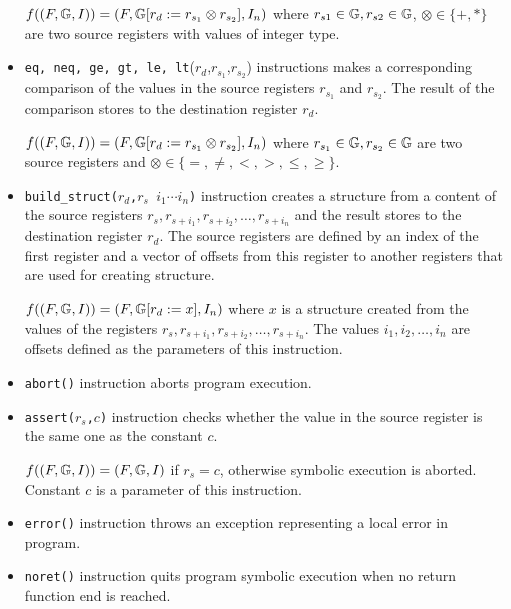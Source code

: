\begin{itemize}
		$f((F, \mathbb{G}, I)) = (F, \mathbb{G} [r_d := r_{s_1} \otimes r_{s_2}], I_n)$
		where $r_{s1} \in \mathbb{G}, r_{s2} \in \mathbb{G}$, $\otimes \in \{+,*\}$
		are two source registers with values of integer type.

	\item {\tt eq, neq, ge, gt, le, lt}($r_d$,$r_{s_1}$,$r_{s_2}$) instructions
		makes a corresponding comparison of the values in the source registers $r_{s_1}$
		and $r_{s_2}$.
		The result of the comparison stores to the destination register $r_d$.
		
		$f((F, \mathbb{G}, I)) = (F, \mathbb{G} [r_d := r_{s_1} \otimes r_{s_2}], I_n)$
		where $r_{s_1} \in \mathbb{G}, r_{s_2} \in \mathbb{G}$ are two source registers
		and $\otimes \in \{=,\neq, <,>,\leq,\geq\}$.
	
	\item {\tt build\_struct($r_d$,$r_{s}$ $i_1 \cdots i_n$)} instruction creates a structure from a
		content of the source registers $r_s,r_{s+i_1},r_{s+i_2}, \ldots, r_{s+i_n}$
		and the result stores to the destination register $r_d$.
		The source registers are defined by an index of the first register and
		a vector of offsets from this register to another registers
		that are used for creating structure.
		
		$f((F, \mathbb{G}, I)) = (F, \mathbb{G} [r_d := x], I_n)$
		where $x$ is a structure created from the values of the registers $r_s,r_{s+i_1},r_{s+i_2}, \ldots, r_{s+i_n}$.
		The values $i_1, i_2, \ldots, i_n$ are offsets defined as the parameters of this instruction.
	
	\item {\tt abort()} instruction aborts program execution.
	
	\item {\tt assert($r_s$,$c$)} instruction checks whether the value
		in the source register is the same one as the constant $c$.
		
		$f((F, \mathbb{G}, I)) = (F, \mathbb{G}, I)$ if $r_s = c$, otherwise
		symbolic execution is aborted.
		Constant $c$ is a parameter of this instruction.
	
	\item {\tt error()} instruction throws an exception representing
		a local error in program.
	
	\item {\tt noret()} instruction quits program symbolic execution when
		no return function end is reached.

\end{itemize}


